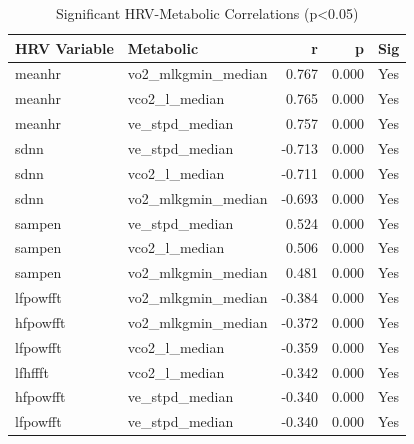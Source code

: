 \begin{table}[htbp]
\centering
\caption{Significant HRV-Metabolic Correlations (p<0.05)}
\label{tab:table_correlations_significant}
\small
\begin{tabular}{llrrl}
\toprule
HRV Variable & Metabolic & r & p & Sig \\
\midrule
meanhr & vo2_mlkgmin_median & 0.767 & 0.000 & Yes \\
meanhr & vco2_l_median & 0.765 & 0.000 & Yes \\
meanhr & ve_stpd_median & 0.757 & 0.000 & Yes \\
sdnn & ve_stpd_median & -0.713 & 0.000 & Yes \\
sdnn & vco2_l_median & -0.711 & 0.000 & Yes \\
sdnn & vo2_mlkgmin_median & -0.693 & 0.000 & Yes \\
sampen & ve_stpd_median & 0.524 & 0.000 & Yes \\
sampen & vco2_l_median & 0.506 & 0.000 & Yes \\
sampen & vo2_mlkgmin_median & 0.481 & 0.000 & Yes \\
lfpowfft & vo2_mlkgmin_median & -0.384 & 0.000 & Yes \\
hfpowfft & vo2_mlkgmin_median & -0.372 & 0.000 & Yes \\
lfpowfft & vco2_l_median & -0.359 & 0.000 & Yes \\
lfhffft & vco2_l_median & -0.342 & 0.000 & Yes \\
hfpowfft & ve_stpd_median & -0.340 & 0.000 & Yes \\
lfpowfft & ve_stpd_median & -0.340 & 0.000 & Yes \\
\bottomrule
\end{tabular}

\end{table}
